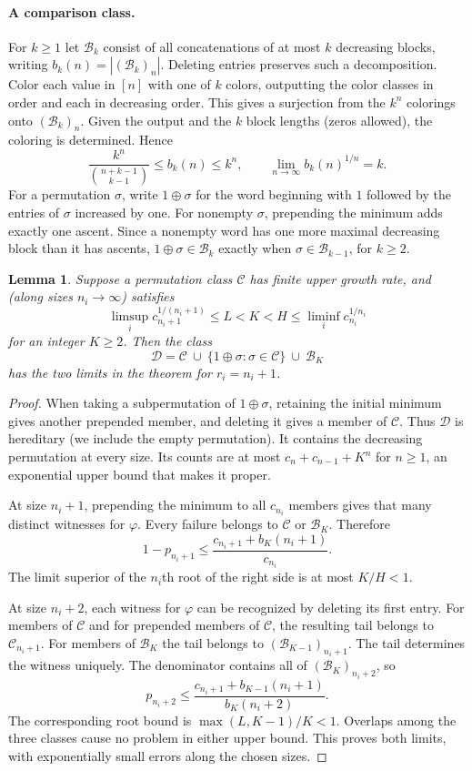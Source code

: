 \documentclass[11pt]{article}
\newtheorem*{lemma}{Lemma}
\newcommand{\C}{\mathcal C}
\newcommand{\D}{\mathcal D}
\newcommand{\B}{\mathcal B}
\begin{document}
\paragraph{A comparison class.}
For $k\ge1$ let $\B_k$ consist of all concatenations of at most $k$ decreasing blocks, writing $b_k(n)=|(\B_k)_n|$. Deleting entries preserves such a decomposition. Color each value in $[n]$ with one of $k$ colors, outputting the color classes in order and each in decreasing order. This gives a surjection from the $k^n$ colorings onto $(\B_k)_n$. Given the output and the $k$ block lengths (zeros allowed), the coloring is determined. Hence
\[
 \frac{k^n}{\binom{n+k-1}{k-1}}\le b_k(n)\le k^n,
 \qquad\lim_{n\to\infty}b_k(n)^{1/n}=k.
\]
For a permutation $\sigma$, write $1\oplus\sigma$ for the word beginning with $1$ followed by the entries of $\sigma$ increased by one. For nonempty $\sigma$, prepending the minimum adds exactly one ascent. Since a nonempty word has one more maximal decreasing block than it has ascents, $1\oplus\sigma\in\B_k$ exactly when $\sigma\in\B_{k-1}$, for $k\ge2$.

\begin{lemma}
Suppose a permutation class $\C$ has finite upper growth rate, and (along sizes $n_i\to\infty$) satisfies
\[
 \limsup_i c_{n_i+1}^{1/(n_i+1)}\le L < K < H
       \le\liminf_i c_{n_i}^{1/n_i}
\]
for an integer $K\ge2$. Then the class
\[
 \D=\C\ \cup\ \{1\oplus\sigma:\sigma\in\C\}\ \cup\ \B_K
\]
has the two limits in the theorem for $r_i=n_i+1$.
\end{lemma}

\begin{proof}
When taking a subpermutation of $1\oplus\sigma$, retaining the initial minimum gives another prepended member, and deleting it gives a member of $\C$. Thus $\D$ is hereditary (we include the empty permutation). It contains the decreasing permutation at every size. Its counts are at most $c_n+c_{n-1}+K^n$ for $n\ge1$, an exponential upper bound that makes it proper.

At size $n_i+1$, prepending the minimum to all $c_{n_i}$ members gives that many distinct witnesses for $\varphi$. Every failure belongs to $\C$ or $\B_K$. Therefore
\[
 1-p_{n_i+1}\le
 \frac{c_{n_i+1}+b_K(n_i+1)}{c_{n_i}} .                         \tag{2}
\]
The limit superior of the $n_i$th root of the right side is at most $K/H<1$.

At size $n_i+2$, each witness for $\varphi$ can be recognized by deleting its first entry. For members of $\C$ and for prepended members of $\C$, the resulting tail belongs to $\C_{n_i+1}$. For members of $\B_K$ the tail belongs to $(\B_{K-1})_{n_i+1}$. The tail determines the witness uniquely. The denominator contains all of $(\B_K)_{n_i+2}$, so
\[
 p_{n_i+2}\le
 \frac{c_{n_i+1}+b_{K-1}(n_i+1)}{b_K(n_i+2)} .                 \tag{3}
\]
The corresponding root bound is $\max(L,K-1)/K<1$. Overlaps among the three classes cause no problem in either upper bound. This proves both limits, with exponentially small errors along the chosen sizes.
\end{proof}
\end{document}
